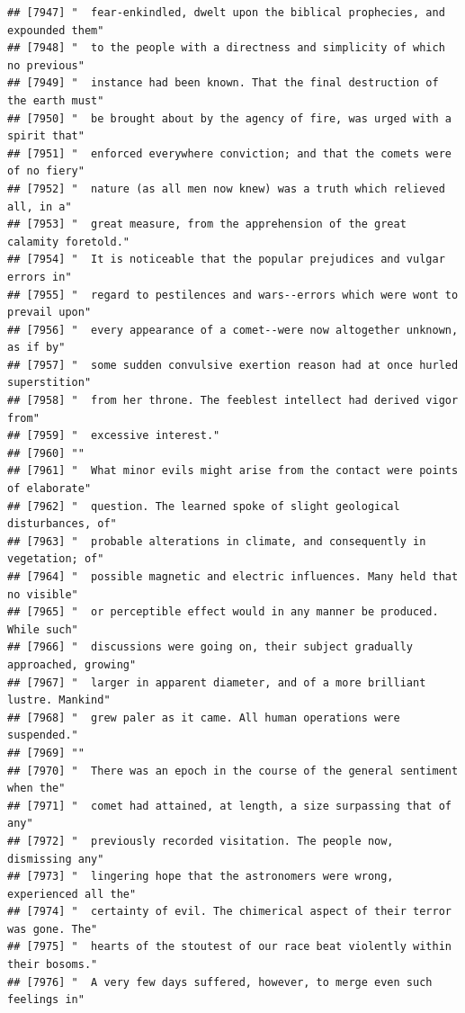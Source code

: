 \documentclass{article}\usepackage[]{graphicx}\usepackage[]{color}
\makeatletter
\newenvironment{kframe}{%
 \def\at@end@of@kframe{}%
 \ifinner\ifhmode%
  \def\at@end@of@kframe{\end{minipage}}%
  \begin{minipage}{\columnwidth}%
 \fi\fi%
 \def\FrameCommand##1{\hskip\@totalleftmargin \hskip-\fboxsep
 \colorbox{shadecolor}{##1}\hskip-\fboxsep
     \hskip-\linewidth \hskip-\@totalleftmargin \hskip\columnwidth}%
 \MakeFramed {\advance\hsize-\width
   \@totalleftmargin\z@ \linewidth\hsize
   \@setminipage}}%
 {\par\unskip\endMakeFramed%
 \at@end@of@kframe}
\newenvironment{knitrout}{}{} %
\makeatother
\begin{document}
\begin{knitrout}
\begin{kframe}
\begin{verbatim}
## [7947] "  fear-enkindled, dwelt upon the biblical prophecies, and expounded them"    
## [7948] "  to the people with a directness and simplicity of which no previous"       
## [7949] "  instance had been known. That the final destruction of the earth must"     
## [7950] "  be brought about by the agency of fire, was urged with a spirit that"      
## [7951] "  enforced everywhere conviction; and that the comets were of no fiery"      
## [7952] "  nature (as all men now knew) was a truth which relieved all, in a"         
## [7953] "  great measure, from the apprehension of the great calamity foretold."      
## [7954] "  It is noticeable that the popular prejudices and vulgar errors in"         
## [7955] "  regard to pestilences and wars--errors which were wont to prevail upon"    
## [7956] "  every appearance of a comet--were now altogether unknown, as if by"        
## [7957] "  some sudden convulsive exertion reason had at once hurled superstition"    
## [7958] "  from her throne. The feeblest intellect had derived vigor from"            
## [7959] "  excessive interest."                                                       
## [7960] ""                                                                            
## [7961] "  What minor evils might arise from the contact were points of elaborate"    
## [7962] "  question. The learned spoke of slight geological disturbances, of"         
## [7963] "  probable alterations in climate, and consequently in vegetation; of"       
## [7964] "  possible magnetic and electric influences. Many held that no visible"      
## [7965] "  or perceptible effect would in any manner be produced. While such"         
## [7966] "  discussions were going on, their subject gradually approached, growing"    
## [7967] "  larger in apparent diameter, and of a more brilliant lustre. Mankind"      
## [7968] "  grew paler as it came. All human operations were suspended."               
## [7969] ""                                                                            
## [7970] "  There was an epoch in the course of the general sentiment when the"        
## [7971] "  comet had attained, at length, a size surpassing that of any"              
## [7972] "  previously recorded visitation. The people now, dismissing any"            
## [7973] "  lingering hope that the astronomers were wrong, experienced all the"       
## [7974] "  certainty of evil. The chimerical aspect of their terror was gone. The"    
## [7975] "  hearts of the stoutest of our race beat violently within their bosoms."    
## [7976] "  A very few days suffered, however, to merge even such feelings in"         

\end{verbatim}
\end{kframe}
\end{knitrout}
\end{document}
